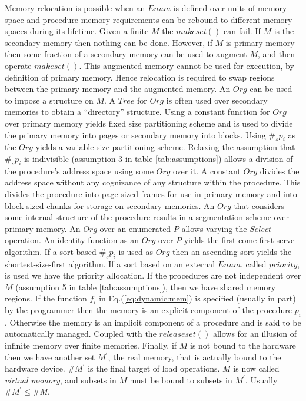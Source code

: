 \documentclass[draft]{article}
\begin{document}
Memory relocation is possible when  an $Enum$ is defined over units of
memory  space and  procedure  memory requirements  can  be rebound  to
different memory spaces  during its lifetime.  Given a  finite $M$ the
$makeset()$ can fail.  If $M$ is the secondary memory then nothing can
be done.   However, if $M$ is  primary memory then some  fraction of a
secondary  memory  can  be  used  to augment  $M$,  and  then  operate
$makeset()$.  This  augmented memory cannot be used  for execution, by
definition of  primary memory.  Hence  relocation is required  to swap
regions between the primary memory and the augmented memory.  An $Org$
can be used to impose a structure on $M$.  A $Tree$ for $Org$ is often
used  over secondary  memories  to obtain  a ``directory''  structure.
Using a constant  function for $Org$ over primary  memory yields fixed
size partitioning scheme and is used to divide the primary memory into
pages or secondary  memory into blocks.  Using $\#_sp_i$  as the $Org$
yields a  variable size partitioning scheme.   Relaxing the assumption
that    $\#_sp_i$   is    indivisible   (assumption    3    in   table
\ref{tab:assumptions})  allows a division  of the  procedure's address
space using some $Org$ over  it.  A constant $Org$ divides the address
space without  any cognizance of  any structure within  the procedure.
This divides the  procedure into page sized frames  for use in primary
memory and into block sized  chunks for storage on secondary memories.
An  $Org$ that  considers  some internal  structure  of the  procedure
results in a  segmentation scheme over primary memory.   An $Org$ over
an enumerated $P$ allows  varying the $Select$ operation.  An identity
function  as  an  $Org$  over $P$  yields  the  first-come-first-serve
algorithm.   If  a sort  based  $\#_sp_i$ is  used  as  $Org$ then  an
ascending sort  yields the  shortest-size-first algorithm.  If  a sort
based on  an external $Enum$, called  $priority$, is used  we have the
priority allocation.   If the procedures are not  independent over $M$
(assumption  5 in  table \ref{tab:assumptions}),  then we  have shared
memory regions.  If the function $f_i$ in Eq.(\ref{eq:dynamic:mem}) is
specified (usually  in part) by the  programmer then the  memory is an
explicit component of the procedure $p_i$.  Otherwise the memory is an
implicit  component of  a procedure  and is  said to  be automatically
managed.  Coupled  with the $releaseset()$  allows for an  illusion of
infinite memory over finite memories.  Finally, if $M$ is not bound to
the hardware  then we  have another set  $M^\prime$, the  real memory,
that is  actually bound to  the hardware device.  $\#M^\prime$  is the
final  target of  load operations.   $M$ is  now  called \emph{virtual
  memory}, and subsets in $M$  must be bound to subsets in $M^\prime$.
Usually $\#M^\prime \le \#M$.
\end{document}
